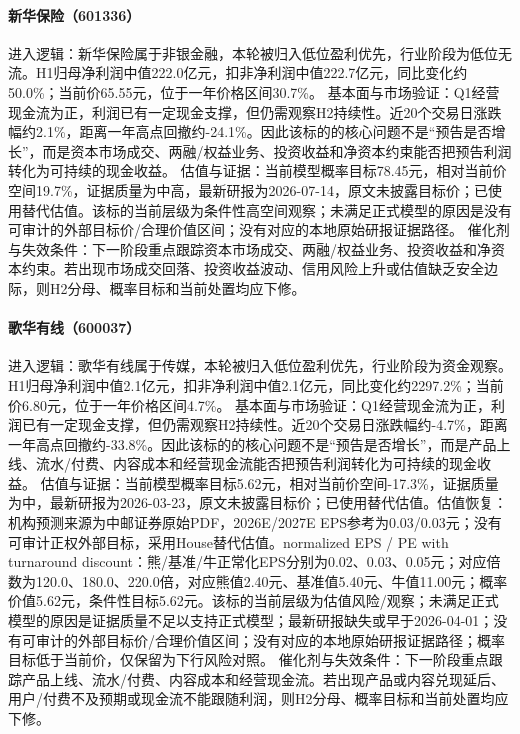 \paragraph{新华保险（601336）}
进入逻辑：新华保险属于非银金融，本轮被归入低位盈利优先，行业阶段为低位无流。H1归母净利润中值222.0亿元，扣非净利润中值222.7亿元，同比变化约50.0\%；当前价65.55元，位于一年价格区间30.7\%。
基本面与市场验证：Q1经营现金流为正，利润已有一定现金支撑，但仍需观察H2持续性。近20个交易日涨跌幅约2.1\%，距离一年高点回撤约-24.1\%。因此该标的的核心问题不是“预告是否增长”，而是资本市场成交、两融/权益业务、投资收益和净资本约束能否把预告利润转化为可持续的现金收益。
估值与证据：当前模型概率目标78.45元，相对当前价空间19.7\%，证据质量为中高，最新研报为2026-07-14，原文未披露目标价；已使用替代估值。该标的当前层级为条件性高空间观察；未满足正式模型的原因是没有可审计的外部目标价/合理价值区间；没有对应的本地原始研报证据路径。
催化剂与失效条件：下一阶段重点跟踪资本市场成交、两融/权益业务、投资收益和净资本约束。若出现市场成交回落、投资收益波动、信用风险上升或估值缺乏安全边际，则H2分母、概率目标和当前处置均应下修。

\paragraph{歌华有线（600037）}
进入逻辑：歌华有线属于传媒，本轮被归入低位盈利优先，行业阶段为资金观察。H1归母净利润中值2.1亿元，扣非净利润中值2.1亿元，同比变化约2297.2\%；当前价6.80元，位于一年价格区间4.7\%。
基本面与市场验证：Q1经营现金流为正，利润已有一定现金支撑，但仍需观察H2持续性。近20个交易日涨跌幅约-4.7\%，距离一年高点回撤约-33.8\%。因此该标的的核心问题不是“预告是否增长”，而是产品上线、流水/付费、内容成本和经营现金流能否把预告利润转化为可持续的现金收益。
估值与证据：当前模型概率目标5.62元，相对当前价空间-17.3\%，证据质量为中，最新研报为2026-03-23，原文未披露目标价；已使用替代估值。估值恢复：机构预测来源为中邮证券原始PDF，2026E/2027E EPS参考为0.03/0.03元；没有可审计正权外部目标，采用House替代估值。normalized EPS / PE with turnaround discount：熊/基准/牛正常化EPS分别为0.02、0.03、0.05元；对应倍数为120.0、180.0、220.0倍，对应熊值2.40元、基准值5.40元、牛值11.00元；概率价值5.62元，条件性目标5.62元。该标的当前层级为估值风险/观察；未满足正式模型的原因是证据质量不足以支持正式模型；最新研报缺失或早于2026-04-01；没有可审计的外部目标价/合理价值区间；没有对应的本地原始研报证据路径；概率目标低于当前价，仅保留为下行风险对照。
催化剂与失效条件：下一阶段重点跟踪产品上线、流水/付费、内容成本和经营现金流。若出现产品或内容兑现延后、用户/付费不及预期或现金流不能跟随利润，则H2分母、概率目标和当前处置均应下修。


